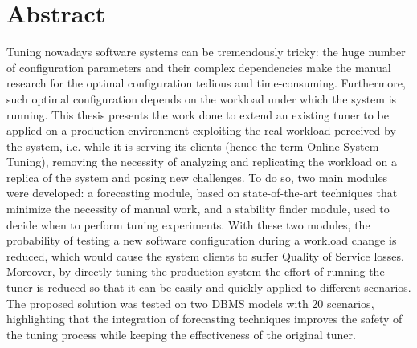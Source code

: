 \documentclass[a4paper, 12pt]{article} %
\begin{document}
	\section*{Abstract}
	Tuning nowadays software systems can be tremendously tricky: the huge number of configuration parameters and their complex dependencies make the manual research for the optimal configuration tedious and time-consuming. Furthermore, such optimal configuration depends on the workload under which the system is running. 
	This thesis presents the work done to extend an existing tuner to be applied on a production environment exploiting the real workload perceived by the system, i.e. while it is serving its clients (hence the term Online System Tuning), removing the necessity of analyzing and replicating the workload on a replica of the system and posing new challenges.
	To do so, two main modules were developed: a forecasting module, based on state-of-the-art techniques that minimize the necessity of manual work, and a stability finder module, used to decide when to perform tuning experiments. With these two modules, the probability of testing a new software configuration during a workload change is reduced, which would cause the system clients to suffer Quality of Service losses.
	Moreover, by directly tuning the production system the effort of running the tuner is reduced so that it can be easily and quickly applied to different scenarios.
	The proposed solution was tested on two DBMS models with 20 scenarios, highlighting that the integration of forecasting techniques improves the safety of the tuning process while keeping the effectiveness of the original tuner.
	
	\clearpage%
	\thispagestyle{empty}%
	\addtocounter{page}{-1}%
	\null%
	\clearpage
	
	\renewcommand{\contentsname}{Index}
	\newpage
	\thispagestyle{plain}
	\tableofcontents

	\clearpage%
	\thispagestyle{empty}%
	\addtocounter{page}{-1}%
	\null%
	\clearpage
	
	
	
	\newpage
	
\end{document}
